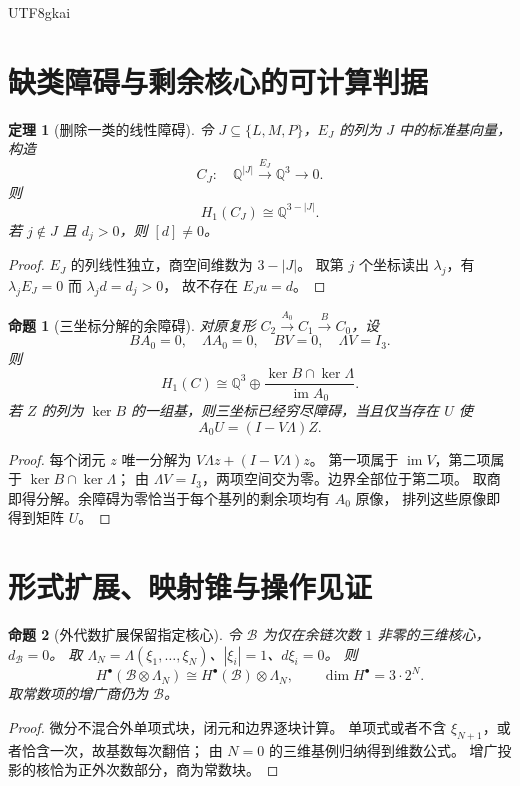 \documentclass[12pt,a4paper,openany]{report}
\newtheorem{theorem}{定理}[chapter]
\newtheorem{proposition}{命题}[chapter]
\numberwithin{equation}{chapter}
\newcommand{\QQ}{\mathbb Q}
\newcommand{\im}{\operatorname{im}}
\begin{document}
\begin{CJK*}{UTF8}{gkai}
\section{缺类障碍与剩余核心的可计算判据}

\begin{theorem}[删除一类的线性障碍]
令 $J\subseteq\{L,M,P\}$，$E_J$ 的列为 $J$ 中的标准基向量，构造
\[
 C_J:\quad\QQ^{|J|}\xrightarrow{E_J}\QQ^3\longrightarrow0.
\]
则
\[
 H_1(C_J)\cong\QQ^{3-|J|}.
\]
若 $j\notin J$ 且 $d_j>0$，则 $[d]\ne0$。
\end{theorem}
\begin{proof}
$E_J$ 的列线性独立，商空间维数为 $3-|J|$。
取第 $j$ 个坐标读出 $\lambda_j$，有 $\lambda_jE_J=0$ 而 $\lambda_jd=d_j>0$，
故不存在 $E_Ju=d$。
\end{proof}

\begin{proposition}[三坐标分解的余障碍]
\label{prop:three-residual}
对原复形 $C_2\xrightarrow{A_0}C_1\xrightarrow B C_0$，设
\[
 BA_0=0,\quad \Lambda A_0=0,\quad BV=0,\quad\Lambda V=I_3.
\]
则
\[
 H_1(C)\cong\QQ^3\oplus
 \frac{\ker B\cap\ker\Lambda}{\im A_0}.
\]
若 $Z$ 的列为 $\ker B$ 的一组基，则三坐标已经穷尽障碍，当且仅当存在 $U$ 使
\[
 A_0U=(I-V\Lambda)Z.
\]
\end{proposition}
\begin{proof}
每个闭元 $z$ 唯一分解为 $V\Lambda z+(I-V\Lambda)z$。
第一项属于 $\im V$，第二项属于 $\ker B\cap\ker\Lambda$；
由 $\Lambda V=I_3$，两项空间交为零。边界全部位于第二项。
取商即得分解。余障碍为零恰当于每个基列的剩余项均有 $A_0$ 原像，
排列这些原像即得到矩阵 $U$。
\end{proof}

\section{形式扩展、映射锥与操作见证}

\begin{proposition}[外代数扩展保留指定核心]
令 $\mathscr B$ 为仅在余链次数 $1$ 非零的三维核心，$d_{\mathscr B}=0$。
取 $\Lambda_N=\Lambda(\xi_1,\ldots,\xi_N)$、$|\xi_i|=1$、$d\xi_i=0$。
则
\[
 H^\bullet(\mathscr B\otimes\Lambda_N)
 \cong H^\bullet(\mathscr B)\otimes\Lambda_N,\qquad
 \dim H^\bullet=3\cdot2^N.
\]
取常数项的增广商仍为 $\mathscr B$。
\end{proposition}
\begin{proof}
微分不混合外单项式块，闭元和边界逐块计算。
单项式或者不含 $\xi_{N+1}$，或者恰含一次，故基数每次翻倍；
由 $N=0$ 的三维基例归纳得到维数公式。
增广投影的核恰为正外次数部分，商为常数块。
\end{proof}


\end{CJK*}
\end{document}
